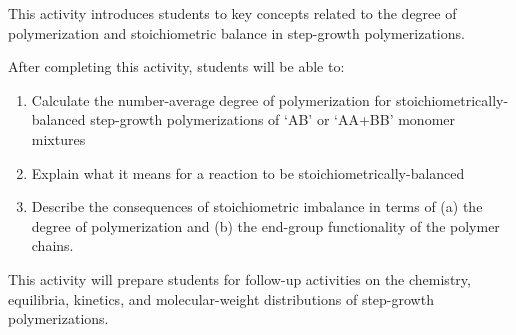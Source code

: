 %
%
%
%

\renewcommand{\figpath}{content/polymchem/stepgrowth/Mn-and-stoich/figs}

\begin{activity}

\begin{instructornotes}

	This activity introduces students to key concepts related to the degree of polymerization and stoichiometric balance in step-growth polymerizations.
	
	After completing this activity, students will be able to:
			\begin{enumerate}
				\item Calculate the number-average degree of polymerization for stoichiometrically-balanced step-growth polymerizations of `AB' or `AA+BB' monomer mixtures
				\item Explain what it means for a reaction to be stoichiometrically-balanced
				\item Describe the consequences of stoichiometric imbalance in terms of (a) the degree of polymerization and (b) the end-group functionality of the polymer chains.
			\end{enumerate}
	This activity will prepare students for follow-up activities on the chemistry, equilibria, kinetics, and molecular-weight distributions of step-growth polymerizations.
			

\end{instructornotes}
\end{activity}
